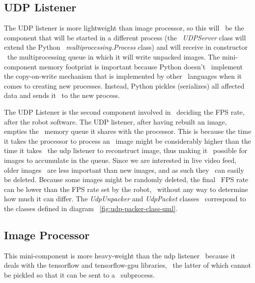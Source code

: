 \subsection{UDP Listener}
\label{subsec:implementation-udp-listener}
The UDP listener is more lightweight than image processor, so this will \
be the component that will be started in a different process (the \
\textit{UDPServer} class will extend the Python \
\textit{multiprocessing.Process} class) and will receive in constructor \
the multiprocessing queue in which it will write unpacked images.
The mini-component memory footprint is important because Python doesn't \
implement the copy-on-write mechanism that is implemented by other \
languages when it comes to creating new processes.
Instead, Python pickles (serializes) all affected data and sends it \
to the new process.

The UDP Listener is the second component involved in \
deciding the FPS rate, after the robot software.
The UDP listener, after having rebuilt an image, empties the \
memory queue it shares with the processor.
This is because the time it takes the processor to process an \
image might be considerably higher than the time it takes \
the udp listener to reconstruct image, thus making it \
possible for images to accumulate in the queue.
Since we are interested in live video feed, older images \
are less important than new images, and as such they \
can easily be deleted.
Because some images might be randomly deleted, the final \
FPS rate can be lower than the FPS rate set by the robot, \
without any way to determine how much it can differ.
The \textit{UdpUnpacker} and \textit{UdpPacket} classes \
correspond to the classes defined in diagram ~\ref{fig:udp-packer-class-uml}.

\subsection{Image Processor}
\label{subsec:implementation-image-processor}
This mini-component is more heavy-weight than the udp listener \
because it deals with the tensorflow and tensorflow-gpu libraries, \
the latter of which cannot be pickled so that it can be sent to a \
subprocess.

